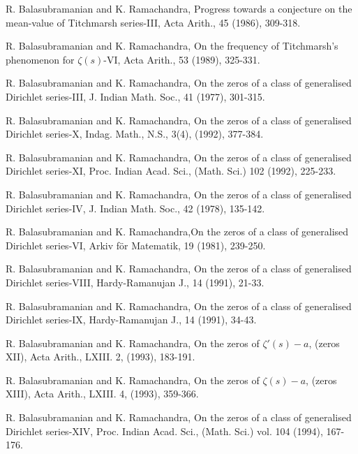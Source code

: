 \begin{thebibliography}{99}
 R. Balasubramanian and K. Ramachandra, Progress towards a conjecture on the mean-value of Titchmarsh series-III, Acta Arith., 45 (1986), 309-318.

 R. Balasubramanian and K. Ramachandra, On the frequency of Titchmarsh's phenomenon for $\zeta(s)$-VI, Acta Arith., 53 (1989), 325-331. 

 R. Balasubramanian and K. Ramachandra, On the zeros of a class of generalised Dirichlet series-III, J. Indian Math. Soc., 41 (1977), 301-315.

 R. Balasubramanian and K. Ramachandra, On the zeros of a class of generalised Dirichlet series-X, Indag. Math., N.S., 3(4), (1992), 377-384.

 R. Balasubramanian and K. Ramachandra, On the zeros of a class of generalised Dirichlet series-XI, Proc. Indian Acad. Sci., (Math. Sci.) 102 (1992), 225-233.

 R. Balasubramanian and K. Ramachandra, On the zeros of a class of generalised Dirichlet series-IV, J. Indian Math. Soc., 42 (1978), 135-142.

 R. Balasubramanian and K. Ramachandra,\pageoriginale On the zeros of a class of generalised Dirichlet series-VI, Arkiv f\"or Matematik, 19 (1981), 239-250.


 R. Balasubramanian and K. Ramachandra, On the zeros of a class of generalised Dirichlet series-VIII, Hardy-Ramanujan J., 14  (1991), 21-33. 

 R. Balasubramanian and K. Ramachandra, On the zeros of a class of generalised Dirichlet series-IX, Hardy-Ramanujan J., 14 (1991), 34-43. 

 R. Balasubramanian and K. Ramachandra, On the zeros of $\zeta'(s) - a$, (zeros XII), Acta Arith., LXIII. 2, (1993), 183-191.

 R. Balasubramanian and K. Ramachandra, On the zeros of $\zeta(s) - a$, (zeros XIII), Acta Arith., LXIII. 4, (1993), 359-366.

 R. Balasubramanian and K. Ramachandra, On the zeros of a class of generalised Dirichlet series-XIV, Proc. Indian Acad. Sci., (Math. Sci.) vol. 104 (1994), 167-176.


\end{thebibliography}
